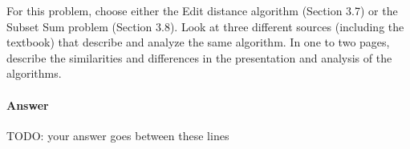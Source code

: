 \documentclass{article}
\begin{document}

\nextprob
{}

For this problem, choose either the Edit distance algorithm (Section 3.7) or the
Subset Sum problem (Section 3.8). Look at three different sources (including the
textbook) that describe
and analyze the same algorithm. In one to two pages, describe the similarities
and differences in the presentation and analysis of the algorithms.

\paragraph{Answer}


TODO: your answer goes between these lines

\end{document}
